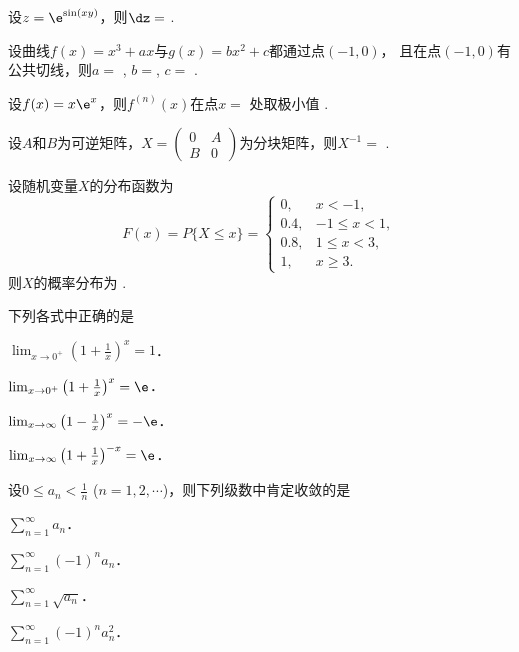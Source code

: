 \documentclass[plain,noanswer,medmath]{../../template/jnuexam}
\begin{document}




\begin{problem}
设$z = \e^{\sin(xy)}$，则$\dz=$ \fillin{}.
\end{problem}


\begin{problem}
设曲线$f(x) = x^3 + ax$与$g(x) = bx^2 + c$都通过点$(-1,0)$，
且在点$(-1,0)$有公共切线，则$a =$ \fillin{}, $b =$\fillin{}, $c =$ \fillin{}.
\end{problem}


\begin{problem}
设$f(x) = x\e^x$，则$f^{(n)}(x)$在点$x=$ \fillin{}处取极小值\fillin{} .
\end{problem}


\begin{problem}
设$A$和$B$为可逆矩阵，$X = \begin{pmatrix}
  0 & A \\
  B & 0
\end{pmatrix}$为分块矩阵，则$X^{-1} =$ \fillin{}.
\end{problem}


\begin{problem}
设随机变量$X$的分布函数为
$$F(x) = P\{X \le x\} = \begin{cases}
    0, & x < - 1, \\
  0.4, & -1 \le x < 1, \\
  0.8, & 1 \le x < 3, \\
    1, & x \ge 3.
\end{cases}$$
则$X$的概率分布为 \fillin{}.
\end{problem}




\begin{problem}
下列各式中正确的是\pickout{}
\begin{abcd}
\item $\lim_{x \to 0^+} \left(1 + \frac{1}{x} \right)^x = 1$．
\item $\lim_{x \to 0^+} \left(1 + \frac{1}{x} \right)^x = \e$．
\item $\lim_{x \to \infty} \left(1 - \frac{1}{x} \right)^x = -\e$．
\item $\lim_{x \to \infty} \left(1 + \frac{1}{x} \right)^{- x} = \e$．
\end{abcd}
\end{problem}


\begin{problem}
设$0 \le a_n < \frac{1}{n}$ ($n = 1,2, \cdots$)，则下列级数中肯定收敛的是\pickout{}
\begin{abcd}
\item $\sum_{n = 1}^{\infty}a_n$．
\item $\sum_{n = 1}^{\infty}(- 1)^n a_n$．
\item $\sum_{n = 1}^{\infty}\sqrt{a_n}$．
\item $\sum_{n = 1}^{\infty}(- 1)^n a_n^2$．
\end{abcd}
\end{problem}
\end{document}
